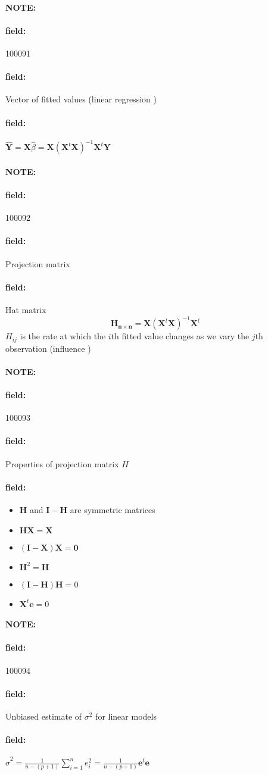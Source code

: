 \documentclass[12pt]{article}
\newenvironment{note}{\paragraph{NOTE:}}{}
\newenvironment{field}{\paragraph{field:}}{}
\begin{document}
\begin{note} \begin{field} \tiny 100091 \end{field}
 \begin{field}
  Vector of fitted values (linear regression )
 \end{field}
 \begin{field}
  $\hat{\mathbf{Y}} = \mathbf{X}\hat{\beta} = \mathbf{X} (\mathbf{X}^t \mathbf{X})^{-1} \mathbf{X}^t \mathbf{Y}$
 \end{field}
\end{note}

\begin{note} \begin{field} \tiny 100092 \end{field}
 \begin{field}
  Projection matrix
 \end{field}
 \begin{field}
  Hat matrix
  $$\mathbf{H_{n \times n}} = \mathbf{X} (\mathbf{X}^t \mathbf{X})^{-1} \mathbf{X}^t$$
  $H_{ij}$ is the rate at which the $i$th fitted value changes as we vary the $j$th observation (influence )
 \end{field}
\end{note}


\begin{note} \begin{field} \tiny 100093 \end{field}
 \begin{field}
  Properties of projection matrix $H$
 \end{field}
 \begin{field}
  \begin{itemize}
   \item $\mathbf{H}$ and $\mathbf{I} - \mathbf{H}$ are symmetric matrices
   \item $\mathbf{HX} = \mathbf{X}$
   \item $(\mathbf{I} - \mathbf{X})\mathbf{X} = \mathbf{0}$
   \item $\mathbf{H}^2 = \mathbf{H}$
   \item $(\mathbf{I} - \mathbf{H})\mathbf{H} = 0$
   \item $\mathbf{X}^t \mathbf{e} = 0$
  \end{itemize}
 \end{field}
\end{note}


\begin{note} \begin{field} \tiny 100094 \end{field}
 \begin{field}
  Unbiased estimate of $\sigma^2$ for linear models
 \end{field}
 \begin{field}
  $\hat{\sigma}^2 = \frac{1}{n- (p+1)} \sum_{i=1}^n e_i^2 = \frac{1}{n- (p+1)} \mathbf{e}^t \mathbf{e}$
 \end{field}
\end{note}
\end{document}
